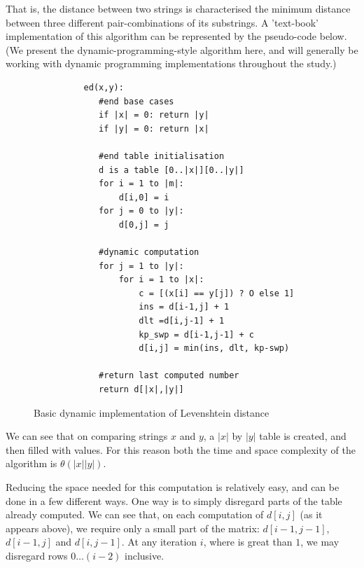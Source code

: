 \documentclass[a4paper,11pt,twoside,notitlepage]{article}
\begin{document}
        That is, the distance between two strings is characterised the
        minimum distance between three different pair-combinations of its
        substrings. A 'text-book' implementation of this algorithm can
        be represented by the pseudo-code below. (We present the
        dynamic-programming-style algorithm here, and will generally
        be working with dynamic programming implementations throughout
        the study.)
        
        \begin{figure}[H]
          \centering
          \begin{lstlisting}
          ed(x,y):
             #end base cases
             if |x| = 0: return |y|
             if |y| = 0: return |x|    

             #end table initialisation
             d is a table [0..|x|][0..|y|]
             for i = 1 to |m|:
                 d[i,0] = i
             for j = 0 to |y|:
                 d[0,j] = j           
             
             #dynamic computation
             for j = 1 to |y|:
                 for i = 1 to |x|:
                     c = [(x[i] == y[j]) ? O else 1]
                     ins = d[i-1,j] + 1
                     dlt =d[i,j-1] + 1
                     kp_swp = d[i-1,j-1] + c
                     d[i,j] = min(ins, dlt, kp-swp)
             
             #return last computed number
             return d[|x|,|y|]
        \end{lstlisting}
        \caption{Basic dynamic implementation of Levenshtein distance}
        \label{fig:levenshtein-dynamic}
        \end{figure}

        We can see that on comparing strings $x$ and $y$, a $|x|$ by
        $|y|$ table is created, and then filled with values. For this
        reason both the time and space complexity of the algorithm is
        $\theta (|x||y|)$.

        Reducing the space needed for this computation is relatively
        easy, and can be done in a few different ways. One way is to
        simply disregard parts of the table already computed. We can
        see that, on each computation of $d[i,j]$ (as it appears
        above), we require only a small part of the matrix:
        $d[i-1,j-1]$, $d[i-1,j]$ and $d[i,j-1]$. At any iteration $i$,
        where is great than $1$, we may disregard rows $0 \dots (i-2)$
        inclusive.
\end{document}
